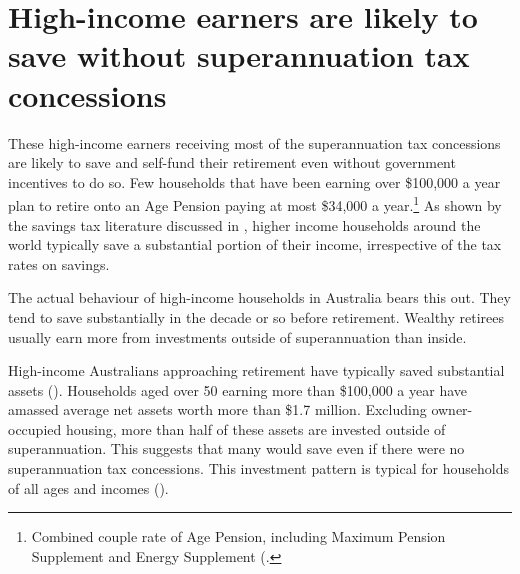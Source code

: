 \section{High-income earners are likely to save without superannuation tax concessions}\label{sec:SUPER-3-2}
These high-income earners receiving most of the superannuation tax concessions are likely to save and self-fund their retirement even without government incentives to do so. Few households that have been earning over \$100,000 a year plan to retire onto an Age Pension paying at most \$34,000 a year.\footnote{Combined couple rate of Age Pension, including Maximum Pension Supplement and Energy Supplement (\textcite{DHS2015IncomeTestForPensions}.}  As shown by the savings tax literature discussed in , higher income households around the world typically save a substantial portion of their income, irrespective of the tax rates on savings. 

The actual behaviour of high-income households in Australia bears this out. They tend to save substantially in the decade or so before retirement. Wealthy retirees usually earn more from investments outside of superannuation than inside. 

High-income Australians approaching retirement have typically saved substantial assets (). Households aged over 50 earning more than \$100,000 a year have amassed average net assets worth more than \$1.7 million. Excluding owner-occupied housing, more than half of these assets are invested outside of superannuation. This suggests that many would save even if there were no superannuation tax concessions. This investment pattern is typical for households of all ages and incomes ().

